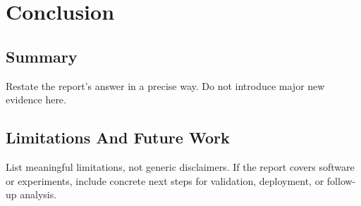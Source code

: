 \chapter{Conclusion}

\section{Summary}

Restate the report's answer in a precise way. Do not introduce major new evidence here.

\section{Limitations And Future Work}

List meaningful limitations, not generic disclaimers. If the report covers software or experiments, include concrete next steps for validation, deployment, or follow-up analysis.

